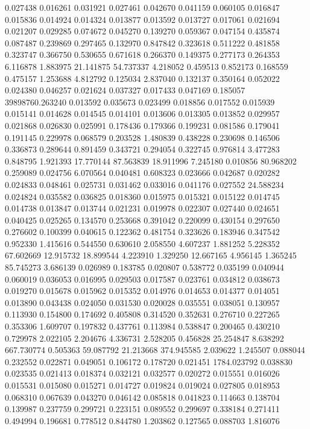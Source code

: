 0.027438
0.016261
0.031921
0.027461
0.042670
0.041159
0.060105
0.016847
0.015836
0.014924
0.014324
0.013877
0.013592
0.013727
0.017061
0.021694
0.021207
0.029285
0.074672
0.045270
0.139270
0.059367
0.047154
0.435874
0.087487
0.239869
0.297465
0.132970
0.847842
0.323618
0.511222
0.481858
0.323747
0.366750
0.530655
0.671618
0.266370
0.149375
0.277173
0.264353
6.116878
1.883975
21.141875
54.737337
4.218052
0.459513
0.852173
0.168559
0.475157
1.253688
4.812792
0.125034
2.837040
0.132137
0.350164
0.052022
0.024380
0.046257
0.021624
0.037327
0.017433
0.047169
0.185057
39898760.263240
0.013592
0.035673
0.023499
0.018856
0.017552
0.015939
0.015141
0.014628
0.014545
0.014101
0.013606
0.013305
0.013852
0.029957
0.021868
0.026830
0.025991
0.178436
0.179366
0.199231
0.081586
0.179041
0.191145
0.229978
0.068579
0.203528
1.480839
0.438228
0.230698
0.146506
0.336873
0.289644
0.891459
0.343721
0.294054
0.322745
0.976814
3.477283
0.848795
1.921393
17.770144
87.563839
18.911996
7.245180
0.010856
80.968202
0.259089
0.024756
6.070564
0.040481
0.608323
0.023666
0.042687
0.020282
0.024833
0.048461
0.025731
0.031462
0.033016
0.041176
0.027552
24.588234
0.024824
0.035582
0.036825
0.018360
0.015975
0.015321
0.015122
0.014745
0.014738
0.013847
0.013744
0.021231
0.019978
0.022307
0.027440
0.024651
0.040425
0.025265
0.134570
0.253668
0.391042
0.220099
0.430154
0.297650
0.276602
0.100399
0.040615
0.122362
0.481754
0.323626
0.183946
0.347542
0.952330
1.415616
0.544550
0.630610
2.058550
4.607237
1.881252
5.228352
67.602669
12.915732
18.899544
4.223910
1.329250
12.667165
4.956145
1.365245
85.745273
3.686139
0.026989
0.183785
0.020807
0.538772
0.035199
0.040944
0.060019
0.036053
0.016995
0.029503
0.017587
0.023761
0.034812
0.038673
0.019270
0.015678
0.015962
0.015352
0.014976
0.014653
0.014377
0.014051
0.013890
0.043438
0.024050
0.031530
0.020028
0.035551
0.038051
0.130957
0.113930
0.154800
0.174692
0.405808
0.314520
0.352631
0.276710
0.227265
0.353306
1.609707
0.197832
0.437761
0.113984
0.538847
0.200465
0.430210
0.729978
2.022105
2.204676
4.336731
2.528205
0.456828
25.254847
8.638292
667.730774
0.505363
59.087792
21.213668
374.945585
2.039622
1.245507
0.088044
0.232552
0.022871
0.049051
0.106172
0.178720
0.021451
1784.023792
0.038830
0.023535
0.021413
0.018374
0.032121
0.032577
0.020272
0.015551
0.016026
0.015531
0.015080
0.015271
0.014727
0.019824
0.019024
0.027805
0.018953
0.068310
0.067639
0.043270
0.046142
0.085818
0.041823
0.114663
0.138704
0.139987
0.237759
0.299721
0.223151
0.089552
0.299697
0.338184
0.271411
0.494994
0.196681
0.778512
0.844780
1.203862
0.127565
0.088703
1.816076
